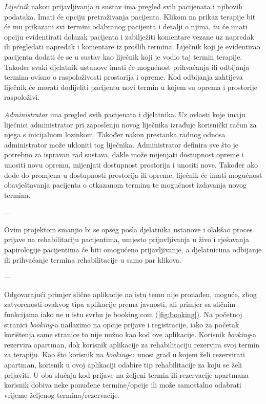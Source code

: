 		\textit{Liječnik} nakon prijavljivanja u sustav ima pregled svih pacijenata i njihovih podataka. Imati će opciju pretraživanja pacijenta. Klikom na prikaz terapije bit će mu prikazani svi termini odabranog pacijenta i detalji o njima, tu će imati opciju evidentirati dolazak pacijenta i zabilježiti komentare vezane uz napredak ili pregledati napredak i komentare iz prošlih termina. Liječnik koji je evidentirao pacijenta dodati će se u sustav kao liječnik koji je vodio taj termin terapije. Također svaki djelatnik ustanove imati će mogućnost prihvaćanja ili odbijanja termina ovisno o raspoloživosti prostorija i opreme. Kod odbijanja zahtijeva liječnik će morati dodijeliti pacijentu novi termin u kojem su oprema i prostorije raspoloživi. 
		
		\textit{Administrator} ima pregled svih pacijenata i djelatnika. Uz ovlasti koje imaju liječnici administrator pri zaposlenju novog liječnika izrađuje korisnički račun za njega s inicijalnom lozinkom. Također nakon prestanka radnog odnosa administrator može ukloniti tog liječnika. Administrator definira sve što je potrebno za ispravan rad sustava, dakle može mijenjati dostupnost opreme i unositi novu opremu, mijenjati dostupnost prostorija i unositi nove. Također ako dođe do promjena u dostupnosti prostorija ili opreme, liječnik će imati mogućnost obavještavanja pacijenta o otkazanom terminu te mogućnost izdavanja novog termina.
		
		---
		
		Ovim projektom smanjio bi se opseg posla djelatnika ustanove i olakšao proces prijave na rehabilitaciju pacijentima, umjesto prijavljivanja u živo i rješavanja papirologije pacijentima će biti omogućeno prijavljivanje, a djelatnicima odbijanje ili prihvaćanje termina rehabilitacije u samo par klikova. 
		
		---
		
		Odgovarajući primjer slične aplikacije na istu temu nije pronađen, moguće, zbog zatvorenosti ovakvog tipa aplikacije prema javnosti, ali primjer sa sličnim funkcijama iako ne u istu svrhu je booking.com (\ref{fig:booking}). Na početnoj stranici \textit{booking}-a nailazimo na opcije prijave i registracije, iako za početak korištenja same stranice to nije nužno kao kod ove aplikacije. Korisnik \textit{booking}-a rezervira apartman, dok korisnik aplikacije za rehabilitaciju rezervira svoj termin za terapiju. Kao što korisnik na \textit{booking}-u unosi grad u kojem želi rezervirati apartman, korisnik u ovoj aplikaciji odabire tip rehabilitacije za koju se želi prijaviti. U oba slučaja kod prijave na željeni termin ili rezervacije apartmana korisnik dobiva neke ponuđene termine/opcije ili može samostalno odabrati vrijeme željenog termina/rezervacije. 
		
